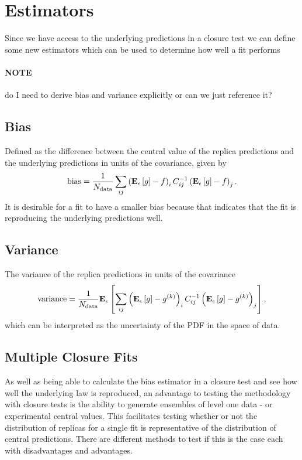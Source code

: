 \section{Estimators}
Since we have access to the underlying predictions in a closure test we can
define some new estimators which can be used to determine how well a fit performs

\paragraph{NOTE}{
    do I need to derive bias and variance explicitly or can we just
    reference it?
}

\subsection{Bias}

Defined as the difference between the central value of the replica predictions
and the underlying predictions in units of the covariance, given by
\begin{equation}
    {\rm bias} = \frac{1}{N_{\rm data}} \sum_{ij} \left( \mathbf{E}_{\epsilon}\left[ g \right] - f \right)_i C^{-1}_{ij} \left( \mathbf{E}_{\epsilon}\left[ g \right] - f \right)_j.
\end{equation}
It is desirable for a fit to have a smaller bias because that indicates
that the fit is reproducing the underlying predictions well.

\subsection{Variance}

The variance of the replica predictions in units of the covariance
\begin{equation}
    {\rm variance} = \frac{1}{N_{\rm data}} \mathbf{E}_{\epsilon}\left[  \sum_{ij} \left( \mathbf{E}_{\epsilon}\left[ g \right] - g^{(k)}\right)_{i} C^{-1}_{ij} \left( \mathbf{E}_{\epsilon}\left[ g \right] - g^{(k)}\right)_{j} \right],
\end{equation}
which can be interpreted as the uncertainty of the PDF in the space of data.

\subsection{Multiple Closure Fits}

As well as being able to calculate the bias estimator in a closure test and
see how well the underlying law is reproduced, an advantage to testing the
methodology with closure tests is the ability to generate ensembles of
level one data - or experimental central values. This facilitates testing
whether or not the distribution of replicas for a single fit is representative of the
distribution of central predictions. There are different methods to test if this
is the case each with disadvantages and advantages.

